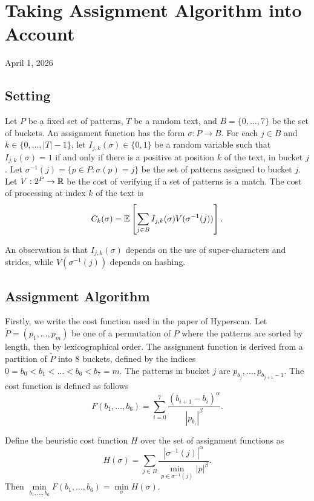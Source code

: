 \chapter{Taking Assignment Algorithm into Account}

\begin{center}
  April 1, 2026
  \vspace{0.5cm}
\end{center}

\section{Setting}
Let $P$ be a fixed set of patterns, $T$ be a random text, and $B=\{0,\ldots,7\}$ be the set of buckets. An assignment function has the form $\sigma: P \to B$. For each $j\in B$ and $k\in\{0,\ldots,|T|-1\}$, let $I_{j,k}(\sigma)\in\{0,1\}$ be a random variable such that $I_{j,k}(\sigma) = 1$ if and only if there is a positive at position $k$ of the text, in bucket $j$. Let $\sigma^{-1}(j) = \{p \in P : \sigma(p) = j\}$ be the set of patterns assigned to bucket $j$. Let $V: 2^P\to{\mathbb{R}}$ be the cost of verifying if a set of patterns is a match. The cost of processing at index $k$ of the text is
$$C_k(\sigma) = \mathbb{E}\left[\sum\limits_{j\in B} I_{j,k}(\sigma) V(\sigma^{-1}(j))\right].$$

An observation is that $I_{j,k}(\sigma)$ depends on the use of super-characters and strides, while $V(\sigma^{-1}(j))$ depends on hashing.


\section{Assignment Algorithm}

Firstly, we write the cost function used in the paper of Hyperscan. Let $\tilde{P}=(p_1,\ldots, p_m)$ be one of a permutation of $P$ where the patterns are sorted by length, then by lexicographical order. The assignment function is derived from a partition of $\tilde{P}$ into 8 buckets, defined by the indices $0=b_0 < b_1 < \ldots < b_6 < b_7 = m$. The patterns in bucket $j$ are $p_{b_j},\ldots, p_{b_{j+1}-1}$. The cost function is defined as follows
$$F(b_1,\ldots, b_6) = \sum_{i=0}^{7}\dfrac{(b_{i+1}-b_{i})^\alpha}{|p_{b_{i}}|^\beta}.$$

\begin{proposition}
  Define the heuristic cost function $H$ over the set of assignment functions as
  $$H(\sigma) = \sum_{j\in B}\dfrac{|\sigma^{-1}(j)|^\alpha}{\min\limits_{p \in \sigma^{-1}(j)} |p|^\beta}.$$
  Then $\min\limits_{b_1,\ldots,b_6}F(b_1,\ldots, b_6) = \min\limits_{\sigma} H(\sigma).$
\end{proposition}


